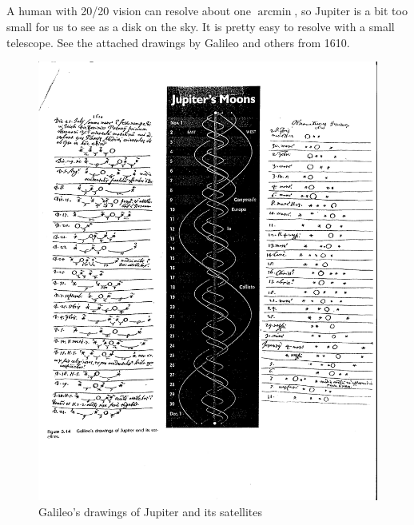 \documentclass[11pt]{scrartcl}
\DeclareMathOperator{\arcmin}{arcmin}
\begin{document}
\subsection{}

A human with 20/20 vision can resolve about one $\arcmin$, so Jupiter is a bit too small for us to see as a disk on the sky. It is pretty easy to resolve with a small telescope. See the attached drawings by Galileo and others from 1610.

\begin{figure}[H]
\centering
\includegraphics[width=\textwidth]{figures/problem-set-1-galileo-drawings.pdf}
\caption{Galileo's drawings of Jupiter and its satellites}
\end{figure}


\section{}
\end{document}
